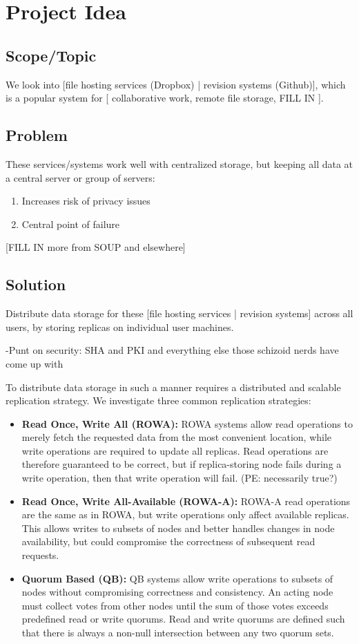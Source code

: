\section{Project Idea}
\subsection{Scope/Topic} 
We look into [file hosting services (Dropbox) | revision systems (Github)], which is a popular system for [ collaborative work, remote file storage, FILL IN ].
\subsection{Problem} 
These services/systems work well with centralized storage, but keeping all data at a central server or group of servers:
\begin{enumerate}
\item Increases risk of privacy issues
\item Central point of failure
\end{enumerate}
[FILL IN more from SOUP and elsewhere]
\subsection{Solution}
Distribute data storage for these [file hosting services | revision systems] across all users, by storing replicas on individual user machines.

-Punt on security: SHA and PKI and everything else those schizoid nerds have come up with

To distribute data storage in such a manner requires a distributed and scalable replication strategy.
We investigate three common replication strategies:
\begin{itemize}
\item \textbf{Read Once, Write All (ROWA):} ROWA systems allow read operations to merely fetch the requested data from the most convenient location, while write operations are required to update all replicas. 
Read operations are therefore guaranteed to be correct, but if replica-storing node fails during a write operation, then that write operation will fail. (PE: necessarily true?)
\item \textbf{Read Once, Write All-Available (ROWA-A):} ROWA-A read operations are the same as in ROWA, but write operations only affect available replicas. 
This allows writes to subsets of nodes and better handles changes in node availability, but could compromise the correctness of subsequent read requests.
\item \textbf{Quorum Based (QB):} QB systems allow write operations to subsets of nodes without compromising correctness and consistency. An acting node must collect votes from other nodes until the sum of those votes exceeds predefined read or write quorums.  Read and write quorums are defined such that there is always a non-null intersection between any two quorum sets.
\end{itemize}

